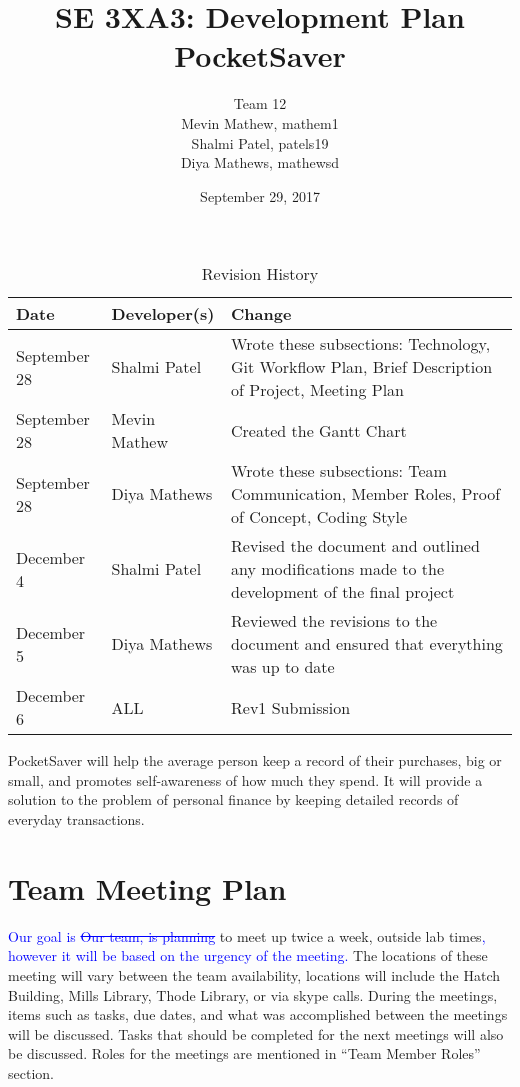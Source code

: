 \documentclass{article}
\title{SE 3XA3: Development Plan\\PocketSaver}
\author{Team 12
		\\ Mevin Mathew, mathem1
		\\ Shalmi Patel, patels19
		\\ Diya Mathews, mathewsd
}
\date{September 29, 2017}
\begin{document}
\begin{table}[hp]
\caption{Revision History} \label{TblRevisionHistory}
\begin{tabularx}{\textwidth}{llX}
\toprule
\textbf{Date} & \textbf{Developer(s)} & \textbf{Change}\\
\midrule
September 28 & Shalmi Patel & Wrote these subsections: Technology, Git Workflow Plan, Brief Description of Project, Meeting Plan\\
September 28 & Mevin Mathew & Created the Gantt Chart\\
September 28 & Diya Mathews & Wrote these subsections: Team Communication, Member Roles, Proof of Concept, Coding Style\\
\midrule
December 4 & Shalmi Patel & Revised the document and outlined any modifications made to the development of the final project\\
December 5 & Diya Mathews & Reviewed the revisions to the document and ensured that everything was up to date\\
December 6 & ALL & Rev1 Submission\\
\bottomrule
\end{tabularx}
\end{table}

\newpage

\maketitle

PocketSaver will help the average person keep a record of their purchases, big or small, and promotes self-awareness of how much they spend. It will provide a solution to the problem of personal finance by keeping detailed records of everyday transactions.

\section{Team Meeting Plan}
\textcolor{blue}{Our goal is \st {Our team, is planning}} to meet up twice a week, outside lab times\textcolor{blue}{, however it will be based on the urgency of the meeting.} The locations of these meeting will vary between the team availability, locations will include the Hatch Building, Mills Library, Thode Library, or via skype calls. During the meetings, items such as tasks, due dates, and what was accomplished between the meetings will be discussed. Tasks that should be completed for the next meetings will also be discussed. Roles for the meetings are mentioned in “Team Member Roles” section.
\end{document}
